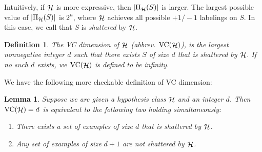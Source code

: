 \documentclass{article}
\newtheorem{lemma}{Lemma}
\newtheorem{definition}{Definition}
\DeclareMathOperator*{\Hcal}{{\cal H}}
\DeclareMathOperator*{\VC}{{\rm VC}}
\begin{document}
Intuitively, if $\Hcal$ is more expressive, then $|\Pi_{\Hcal}(S)|$ is larger. The largest possible value of $|\Pi_{\Hcal}(S)|$ is $2^n$, where $\Hcal$ achieves all possible $+1/-1$ labelings on $S$. In this case, we call that $S$ is {\em shattered} by $\Hcal$.

\begin{definition}
The VC dimension of $\Hcal$ (abbrev. $\VC(\Hcal)$), is the largest nonnegative integer $d$ such that there exists $S$ of size $d$ that is shattered by $\Hcal$. If no such $d$ exists,
we $\VC(\Hcal)$ is defined to be infinity.
\end{definition}

We have the following more checkable definition of VC dimension:
\begin{lemma}
Suppose we are given a hypothesis class $\Hcal$ and an integer $d$.
Then $\VC(\Hcal) = d$ is equivalent to the following two holding simultaneously:
\begin{enumerate}
\item There exists a set of examples of size $d$ that is shattered by $\Hcal$.
\item Any set of examples of size $d+1$ are not shattered by $\Hcal$.
\end{enumerate}
\end{lemma}
\end{document}

